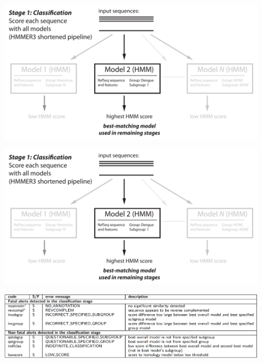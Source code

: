 \documentclass[landscape]{slides}
\begin{document}
\begin{slide}
\begin{center}

\includegraphics[width=9.5in]{figs/v-annotate-stage1-2}

\end{center}
\vfill
\end{slide}
\begin{slide}
\begin{center}

\includegraphics[width=9.5in]{figs/v-annotate-stage1-2}

\includegraphics[width=10.5in]{figs/ss-class-alert-list}

\end{center}
\vfill
\end{slide}
\end{document}
